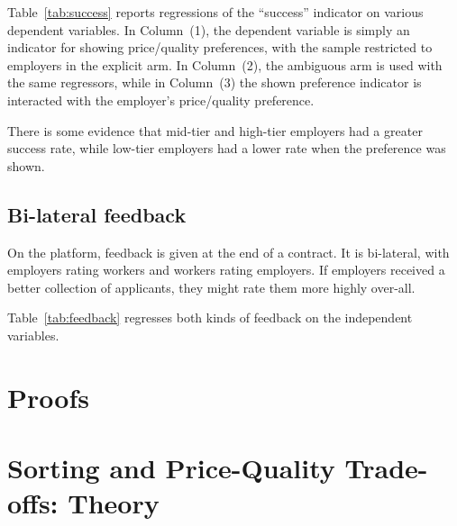  

Table~\ref{tab:success} reports regressions of the ``success'' indicator on various dependent variables. 
In Column~(1), the dependent variable is simply an indicator for showing price/quality preferences, with the sample restricted to employers in the explicit arm. 
In Column~(2), the ambiguous arm is used with the same regressors, while in Column~(3) the shown preference indicator is interacted with the employer's price/quality preference. 

There is some evidence that mid-tier and high-tier employers had a greater success rate, while low-tier employers had a lower rate when the preference was shown.
 
\subsection{Bi-lateral feedback} 
On the platform, feedback is given at the end of a contract. 
It is bi-lateral, with employers rating workers and workers rating employers.  
If employers received a better collection of applicants, they might rate them more highly over-all. 

Table~\ref{tab:feedback} regresses both kinds of feedback on the independent variables. 

 
%
%

\section{Proofs}

\section{Sorting and Price-Quality Trade-offs: Theory} 
\label{sec:theory}

